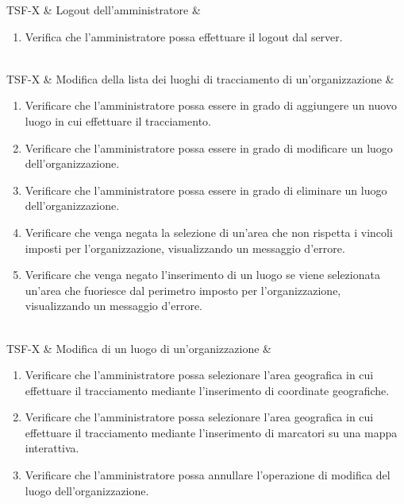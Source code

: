 TSF-X & Logout dell'amministratore & \begin{enumerate}
    \item Verifica che l'amministratore possa effettuare il logout dal server.
\end{enumerate} \\

TSF-X & Modifica della lista dei luoghi di tracciamento di un'organizzazione & \begin{enumerate}
    \item Verificare che l'amministratore possa essere in grado di aggiungere un nuovo luogo in cui effettuare il tracciamento.
    \item Verificare che l'amministratore possa essere in grado di modificare un luogo dell'organizzazione.
    \item Verificare che l'amministratore possa essere in grado di eliminare un luogo dell'organizzazione.
    \item Verificare che venga negata la selezione di un'area che non rispetta i vincoli imposti per l'organizzazione, visualizzando un messaggio d'errore.
    \item Verificare che venga negato l'inserimento di un luogo se viene selezionata un'area che fuoriesce dal perimetro imposto per l'organizzazione, visualizzando un messaggio d'errore.
\end{enumerate} \\

TSF-X & Modifica di un luogo di un'organizzazione & \begin{enumerate}
    \item Verificare che l'amministratore possa selezionare l'area geografica in cui effettuare il tracciamento mediante l'inserimento di coordinate geografiche.
    \item Verificare che l'amministratore possa selezionare l'area geografica in cui effettuare il tracciamento mediante l'inserimento di marcatori su una mappa interattiva.
    \item Verificare che l'amministratore possa annullare l'operazione di modifica del luogo dell'organizzazione.
\end{enumerate} \\

